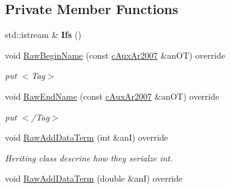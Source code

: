 \subsection*{Private Member Functions}
\begin{DoxyCompactItemize}
\item 
std\+::istream \& {\bfseries Ifs} ()\hypertarget{classMMVII_1_1cIXml__Ar2007_a1b0a9007579706f44885eacd57843386}{}\label{classMMVII_1_1cIXml__Ar2007_a1b0a9007579706f44885eacd57843386}

\item 
void \hyperlink{classMMVII_1_1cIXml__Ar2007_a345c798822ddbf92f234eba31269f328}{Raw\+Begin\+Name} (const \hyperlink{classMMVII_1_1cAuxAr2007}{c\+Aux\+Ar2007} \&an\+OT) override\hypertarget{classMMVII_1_1cIXml__Ar2007_a345c798822ddbf92f234eba31269f328}{}\label{classMMVII_1_1cIXml__Ar2007_a345c798822ddbf92f234eba31269f328}

\begin{DoxyCompactList}\small\item\em put $<$\+Tag$>$ \end{DoxyCompactList}\item 
void \hyperlink{classMMVII_1_1cIXml__Ar2007_a8696e9426e194a054eb4cdbb33770865}{Raw\+End\+Name} (const \hyperlink{classMMVII_1_1cAuxAr2007}{c\+Aux\+Ar2007} \&an\+OT) override\hypertarget{classMMVII_1_1cIXml__Ar2007_a8696e9426e194a054eb4cdbb33770865}{}\label{classMMVII_1_1cIXml__Ar2007_a8696e9426e194a054eb4cdbb33770865}

\begin{DoxyCompactList}\small\item\em put $<$/\+Tag$>$ \end{DoxyCompactList}\item 
void \hyperlink{classMMVII_1_1cIXml__Ar2007_abcae4f7de4b4a765caf7f1322d611c4e}{Raw\+Add\+Data\+Term} (int \&anI) override\hypertarget{classMMVII_1_1cIXml__Ar2007_abcae4f7de4b4a765caf7f1322d611c4e}{}\label{classMMVII_1_1cIXml__Ar2007_abcae4f7de4b4a765caf7f1322d611c4e}

\begin{DoxyCompactList}\small\item\em Heriting class descrine how they serialze int. \end{DoxyCompactList}\item 
void \hyperlink{classMMVII_1_1cIXml__Ar2007_a1c4e8d58bea152548d0322359b1ec5b2}{Raw\+Add\+Data\+Term} (double \&anI) override\hypertarget{classMMVII_1_1cIXml__Ar2007_a1c4e8d58bea152548d0322359b1ec5b2}{}\label{classMMVII_1_1cIXml__Ar2007_a1c4e8d58bea152548d0322359b1ec5b2}


\end{DoxyCompactItemize}
